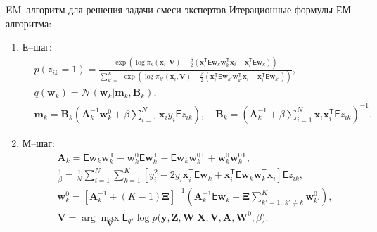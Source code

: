 \documentclass[9pt,pdf,hyperref={unicode}]{beamer}
\begin{document}
\begin{frame}{EM--алгоритм для решения задачи смеси экспертов}
\justifying
Итерационные формулы ЕМ--алгоритма:
	\begin{enumerate}
		\item Е--шаг: 
			\begin{equation*}
				\begin{aligned}
					&p\left(z_{ik} = 1\right) = \frac{\exp\left(\log\pi_{k}\left(\textbf{x}_{i}, \textbf{V}\right) - \frac{\beta}{2}\left(\textbf{x}_{i}^{\mathsf{T}}\mathsf{E}\textbf{w}_{k}\textbf{w}_{k}^{\mathsf{T}}\textbf{x}_{i} - \textbf{x}_{i}^{\mathsf{T}}\mathsf{E}\textbf{w}_{k}\right)\right)}{\sum_{k'=1}^{K}\exp\left(\log\pi_{k'}\left(\textbf{x}_{i}, \textbf{V}\right) - \frac{\beta}{2}\left(\textbf{x}_{i}^{\mathsf{T}}\mathsf{E}\textbf{w}_{k'}\textbf{w}_{k'}^{\mathsf{T}}\textbf{x}_{i} - \textbf{x}_{i}^{\mathsf{T}}\mathsf{E}\textbf{w}_{k'}\right) \right)},\\
					&q(\textbf{w}_k) = \mathcal{N}(\textbf{w}_k|\textbf{m}_k, \textbf{B}_k),\\
					&\mathbf{m}_{k} = \mathbf{B}_{k}\left(\mathbf{A}_{k}^{-1}\mathbf{w}_{k}^{0}+\beta\sum_{i=1}^{N}\mathbf{x}_{i}y_{i}\mathsf{E}z_{ik}\right), \quad
					\mathbf{B}_{k} = \left(\mathbf{A}_{k}^{-1}+\beta\sum_{i=1}^{N}\mathbf{x}_{i}\mathbf{x}_{i}^{\mathsf{T}}\mathsf{E}z_{ik}\right)^{-1} .
				\end{aligned}
			\end{equation*}
		\item М--шаг: 
			\begin{equation*}
				\begin{aligned}
					&\textbf{A}_{k} = \mathsf{E}\textbf{w}_{k}\textbf{w}_{k}^{\mathsf{T}} - \textbf{w}_{k}^{0}\mathsf{E}\textbf{w}_{k}^{\mathsf{T}} - \mathsf{E}\textbf{w}_{k}\textbf{w}_{k}^{0\mathsf{T}} + \textbf{w}_{k}^{0}\textbf{w}_{k}^{0\mathsf{T}}, \\
					 &\frac{1}{\beta}=\frac{1}{N}\sum_{i=1}^{N}\sum_{k=1}^{K}\left[y_{i}^{2}-2y_{i}\textbf{x}_{i}^{\mathsf{T}}\mathsf{E}\textbf{w}_{k} + \textbf{x}_{i}^{\mathsf{T}}\mathsf{E}\textbf{w}_{k}\textbf{w}_{k}^{\mathsf{T}}\textbf{x}_{i}\right]\mathsf{E}z_{ik},\\
					&\textbf{w}_{k}^{0} =\left[\textbf{A}_{k}^{-1}+\left(K-1\right)\bm{\Xi}\right]^{-1}\left(\textbf{A}^{-1}_{k}\mathsf{E}\textbf{w}_{k}+\bm{\Xi}\sum_{k'=1,~k'\not=k}^{K}\textbf{w}_{k'}^{0}\right),\\
					&\textbf{V}= \arg\max_{\textbf{V}} \mathsf{E}_{q^{s}}\log p\bigr(\mathbf{y}, \textbf{Z},\mathbf{W}|\mathbf{X}, \mathbf{V}, \textbf{A}, \textbf{W}^{0}, \beta\bigr).
				\end{aligned}
			\end{equation*}
	\end{enumerate}
\end{frame}
\end{document}
